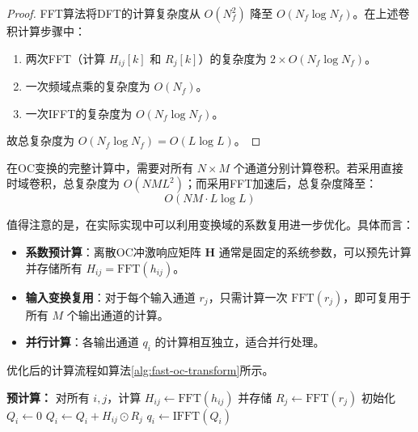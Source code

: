 \begin{proof}
    FFT算法将DFT的计算复杂度从 $O(N_f^2)$ 降至 $O(N_f \log N_f)$。在上述卷积计算步骤中：
    \begin{enumerate}
        \item 两次FFT（计算 $H_{ij}[k]$ 和 $R_j[k]$）的复杂度为 $2 \times O(N_f \log N_f)$。
        \item 一次频域点乘的复杂度为 $O(N_f)$。
        \item 一次IFFT的复杂度为 $O(N_f \log N_f)$。
    \end{enumerate}
    故总复杂度为 $O(N_f \log N_f) = O(L \log L)$。
\end{proof}

在OC变换的完整计算中，需要对所有 $N \times M$ 个通道分别计算卷积。若采用直接时域卷积，总复杂度为 $O(NML^2)$；而采用FFT加速后，总复杂度降至：
\begin{equation}
    O(NM \cdot L \log L)
\end{equation}

值得注意的是，在实际实现中可以利用变换域的系数复用进一步优化。具体而言：
\begin{itemize}
    \item \textbf{系数预计算}：离散OC冲激响应矩阵 $\mathbf{H}$ 通常是固定的系统参数，可以预先计算并存储所有 $H_{ij} = \mathrm{FFT}(h_{ij})$。
    \item \textbf{输入变换复用}：对于每个输入通道 $r_j$，只需计算一次 $\mathrm{FFT}(r_j)$，即可复用于所有 $M$ 个输出通道的计算。
    \item \textbf{并行计算}：各输出通道 $q_i$ 的计算相互独立，适合并行处理。
\end{itemize}

优化后的计算流程如算法\ref{alg:fast-oc-transform}所示。
\begin{algorithm}
    \caption{基于FFT的快速OC变换算法}
    \label{alg:fast-oc-transform}
    \begin{algorithmic}[1]
        \State \textbf{预计算：} 对所有 $i,j$，计算 $H_{ij} \gets \mathrm{FFT}(h_{ij})$ 并存储
        \State $R_j \gets \mathrm{FFT}(r_j)$ 
        \EndFor
        \State 初始化 $Q_i \gets 0$ 
        \State $Q_i \gets Q_i + H_{ij} \odot R_j$ 
        \EndFor
        \State $q_i \gets \mathrm{IFFT}(Q_i)$ 
        \EndFor
    \end{algorithmic}
\end{algorithm}

